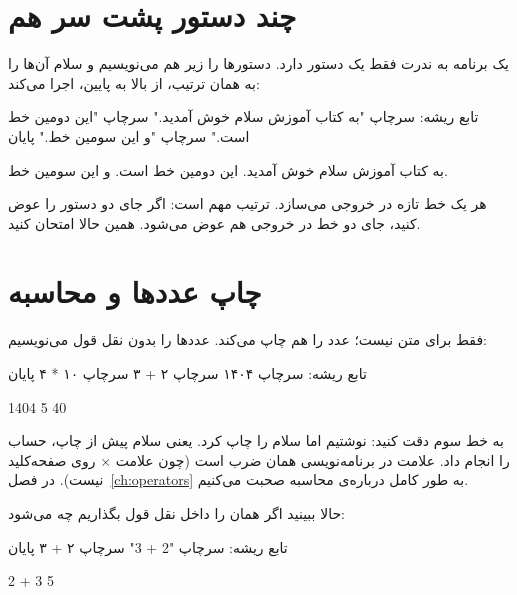 \section{چند دستور پشت سر هم}

یک برنامه به ندرت فقط یک دستور دارد. دستورها را زیر هم می‌نویسیم و سلام
آن‌ها را به همان ترتیب، از بالا به پایین، اجرا می‌کند:

\begin{salamfa}
تابع ریشه:
    سرچاپ "به کتاب آموزش سلام خوش آمدید."
    سرچاپ "این دومین خط است."
    سرچاپ "و این سومین خط."
پایان
\end{salamfa}

\begin{outputfa}
به کتاب آموزش سلام خوش آمدید.
این دومین خط است.
و این سومین خط.
\end{outputfa}

هر  یک خط تازه در خروجی می‌سازد. ترتیب مهم است: اگر جای دو دستور
را عوض کنید، جای دو خط در خروجی هم عوض می‌شود. همین حالا امتحان کنید.

\section{چاپ عددها و محاسبه}

 فقط برای متن نیست؛ عدد را هم چاپ می‌کند. عددها را بدون نقل قول
می‌نویسیم:

\begin{salamfa}
تابع ریشه:
    سرچاپ ۱۴۰۴
    سرچاپ ۲ + ۳
    سرچاپ ۱۰ * ۴
پایان
\end{salamfa}

\begin{outputfa}
1404
5
40
\end{outputfa}

به خط سوم دقت کنید: نوشتیم  اما سلام  را چاپ کرد. یعنی
سلام پیش از چاپ، حساب را انجام داد. علامت \code{*} در برنامه‌نویسی همان ضرب
است (چون علامت × روی صفحه‌کلید نیست). در فصل~\ref{ch:operators} به طور کامل
درباره‌ی محاسبه صحبت می‌کنیم.

حالا ببینید اگر همان  را داخل نقل قول بگذاریم چه می‌شود:

\begin{salamfa}
تابع ریشه:
    سرچاپ "2 + 3"
    سرچاپ ۲ + ۳
پایان
\end{salamfa}

\begin{outputfa}
2 + 3
5
\end{outputfa}

